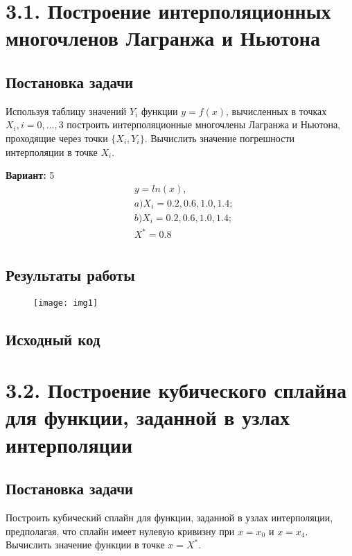 \section* {3.1. Построение интерполяционных многочленов Лагранжа и Ньютона}


\subsection{Постановка задачи}
Используя таблицу значений $Y_i$ функции $y = f(x)$, вычисленных в точках $X_i, i = 0, ..., 3$ построить интерполяционные многочлены Лагранжа и Ньютона, проходящие через точки $\{X_i, Y_i\}$.  Вычислить значение погрешности интерполяции в точке $X_i$. 

{\bfseries Вариант:} 5
\begin{align*}
& y = ln(x), \\
& a) X_i = 0.2, 0.6, 1.0, 1.4;\\
& b) X_i = 0.2, 0.6, 1.0, 1.4;\\
& X^* = 0.8 \\
\end{align*}

\subsection{Результаты работы}
\begin{figure}[h!]
\centering
\texttt{[image: img1]}
\end{figure}

\subsection{Исходный код}

\pagebreak

\section* {3.2. Построение кубического сплайна для функции, заданной в узлах интерполяции}

\setcounter{subsection}{0}


\subsection{Постановка задачи}
Построить кубический сплайн для функции, заданной в узлах интерполяции, предполагая, что сплайн имеет нулевую кривизну при $x = x_0$ и $x = x_4$. Вычислить значение функции в точке $x = X^*$.  

